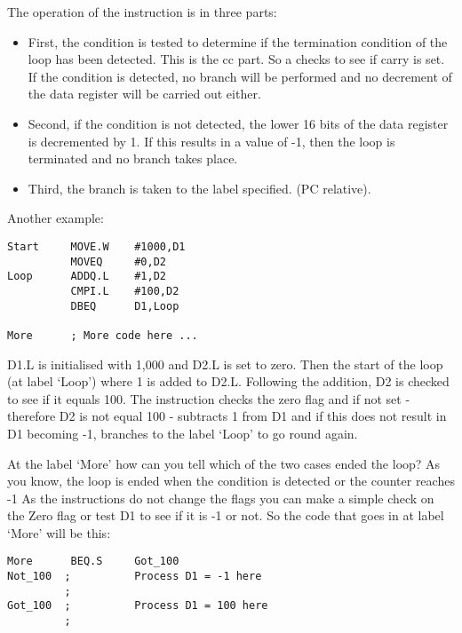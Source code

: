 The operation of the instruction is in three parts:

\begin{itemize}

\item First, the condition is tested to determine if the termination
    condition of the loop has been detected. This is the cc part. So a 
    checks to see if carry is set. If the condition is detected, no branch
    will be performed and no decrement of the data register will be carried
    out either.

\item Second, if the condition is not detected, the lower 16 bits of the
    data register is decremented by 1. If this results in a value of -{}1, then
    the loop is terminated and no branch takes place.

\item Third, the branch is taken to the label specified. (PC
    relative).

\end{itemize}

Another example:

\begin{lstlisting}[firstnumber=1,caption={DBNE Example}]
Start     MOVE.W    #1000,D1
          MOVEQ     #0,D2
Loop      ADDQ.L    #1,D2
          CMPI.L    #100,D2
          DBEQ      D1,Loop

More      ; More code here ...
\end{lstlisting}

D1.L is initialised with 1,000 and D2.L is set to zero. Then the
    start of the loop (at label `Loop') where 1 is added to D2.L. Following
    the addition, D2 is checked to see if it equals 100. The  instruction
    checks the zero flag and if not set -{} therefore D2 is not equal 100 -{}
    subtracts 1 from D1 and if this does not result in D1 becoming -{}1,
    branches to the label `Loop' to go round again.

At the label `More' how can you tell which of the two cases ended
    the loop? As you know, the loop is ended when the condition is detected
    or the counter reaches -{}1 As the  instructions do not change the flags
    you can make a simple check on the Zero flag or test D1 to see if it is -{}1
    or not. So the code that goes in at label `More' will be this:

\begin{lstlisting}[firstnumber=1,]
More      BEQ.S     Got_100
Not_100  ;          Process D1 = -1 here
         ;
Got_100  ;          Process D1 = 100 here
         ;
\end{lstlisting}

